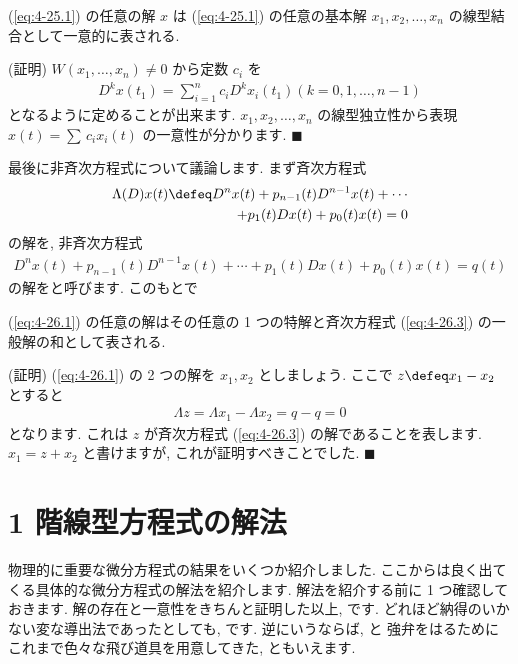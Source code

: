 \documentclass[openany, a4paper, oneside]{jsbook}
\begin{document}
\begin{thm}
(\ref{eq:4-25.1}) の任意の解 $x$ は ({\ref{eq:4-25.1}}) の任意の基本解
$x_1 , x_2 , \dots , x_n$ の線型結合として一意的に表される.
\end{thm}
(証明)
$W (x_1 ,\dots ,x_n) \not= 0$ から定数 $c_i$ を
\begin{gather}
D^k x (t_1)
=
\sum_{i=1}^n c_i D^k x_i (t_1) ( k = 0, 1, \dots , n-1 )
\end{gather}
となるように定めることが出来ます.
$x_1 , x_2 , \dots , x_n$ の線型独立性から表現 $x (t) = \sum \, c_i x_i (t)$ の一意性が分かります.  $\blacksquare$

最後に非斉次方程式について議論します.
まず斉次方程式
\begin{gather}
\begin{split}
\Lambda (D) x (t)
\defeq
D^n x (t) + p_{n-1} (t) D^{n-1} x (t) + \dotsb \\
+p_{1}(t) D x (t) + p_{0}(t) x (t)
=
0
\end{split}
\label{eq:4-26.3}
\end{gather}
の解を, 非斉次方程式
\begin{gather}
D^n x (t) + p_{n-1} (t) D^{n-1} x (t) + \dotsb + p_{1}(t) D x (t) + p_{0}(t) x (t)
=
q (t)
\label{eq:4-26.1}
\end{gather}
の解をと呼びます.
このもとで
\begin{thm}
(\ref{eq:4-26.1}) の任意の解はその任意の 1 つの特解と斉次方程式
(\ref{eq:4-26.3}) の一般解の和として表される.
\end{thm}
(証明)
(\ref{eq:4-26.1}) の 2 つの解を $x_1 , x_2$ としましょう.
ここで $z \defeq x_1 - x_2$ とすると
\begin{gather}
\Lambda z
=
\Lambda x_1 - \Lambda x_2
=q -q
=
0
\end{gather}
となります.
これは $z$ が斉次方程式 (\ref{eq:4-26.3}) の解であることを表します.
 $x_1 = z + x_2$ と書けますが, これが証明すべきことでした.  $\blacksquare$
\section{1 階線型方程式の解法}

物理的に重要な微分方程式の結果をいくつか紹介しました.
ここからは良く出てくる具体的な微分方程式の解法を紹介します.
解法を紹介する前に 1 つ確認しておきます.
解の存在と一意性をきちんと証明した以上,
です.
どれほど納得のいかない変な導出法であったとしても, です.
逆にいうならば, と
強弁をはるためにこれまで色々な飛び道具を用意してきた, ともいえます.
\end{document}
